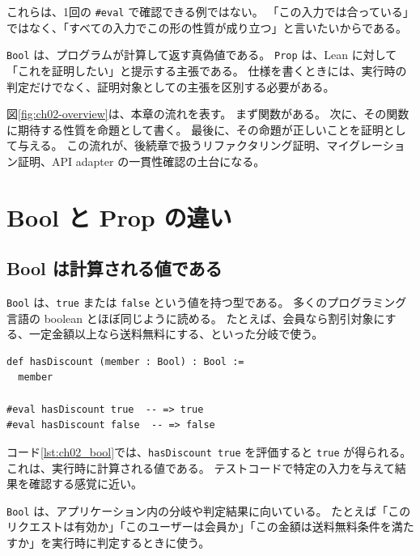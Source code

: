 これらは、1回の \texttt{\#eval} で確認できる例ではない。
「この入力では合っている」ではなく、「すべての入力でこの形の性質が成り立つ」と言いたいからである。

\begin{intuitionbox}
\texttt{Bool} は、プログラムが計算して返す真偽値である。
\texttt{Prop} は、Lean に対して「これを証明したい」と提示する主張である。
仕様を書くときには、実行時の判定だけでなく、証明対象としての主張を区別する必要がある。
\end{intuitionbox}


図\ref{fig:ch02-overview}は、本章の流れを表す。
まず関数がある。
次に、その関数に期待する性質を命題として書く。
最後に、その命題が正しいことを証明として与える。
この流れが、後続章で扱うリファクタリング証明、マイグレーション証明、API adapter の一貫性確認の土台になる。

\section{Bool と Prop の違い}

\subsection{Bool は計算される値である}

\texttt{Bool} は、\texttt{true} または \texttt{false} という値を持つ型である。
多くのプログラミング言語の boolean とほぼ同じように読める。
たとえば、会員なら割引対象にする、一定金額以上なら送料無料にする、といった分岐で使う。

\begin{listing}[htbp]
\begin{verbatim}
def hasDiscount (member : Bool) : Bool :=
  member

#eval hasDiscount true  -- => true
#eval hasDiscount false  -- => false
\end{verbatim}
\caption{Bool は計算される真偽値である}
\label{lst:ch02_bool}
\end{listing}

コード\ref{lst:ch02_bool}では、\texttt{hasDiscount true} を評価すると \texttt{true} が得られる。
これは、実行時に計算される値である。
テストコードで特定の入力を与えて結果を確認する感覚に近い。

\begin{softwarebox}
\texttt{Bool} は、アプリケーション内の分岐や判定結果に向いている。
たとえば「このリクエストは有効か」「このユーザーは会員か」「この金額は送料無料条件を満たすか」を実行時に判定するときに使う。
\end{softwarebox}

